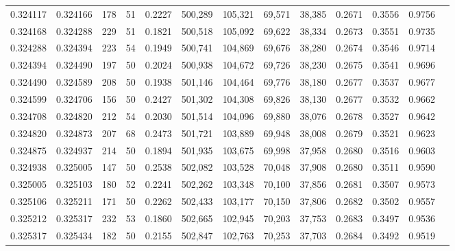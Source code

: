 \begin{tabular}{rrrrrrrrrrrrr}
0.324117 & 0.324166 &   178 &  51 &                                     0.2227 & 500,289 & 105,321 &  69,571 &  38,385 & 0.2671 & 0.3556 & 0.9756 \\
0.324168 & 0.324288 &   229 &  51 &                                     0.1821 & 500,518 & 105,092 &  69,622 &  38,334 & 0.2673 & 0.3551 & 0.9735 \\
0.324288 & 0.324394 &   223 &  54 &                                     0.1949 & 500,741 & 104,869 &  69,676 &  38,280 & 0.2674 & 0.3546 & 0.9714 \\
0.324394 & 0.324490 &   197 &  50 &                                     0.2024 & 500,938 & 104,672 &  69,726 &  38,230 & 0.2675 & 0.3541 & 0.9696 \\
0.324490 & 0.324589 &   208 &  50 &                                     0.1938 & 501,146 & 104,464 &  69,776 &  38,180 & 0.2677 & 0.3537 & 0.9677 \\
0.324599 & 0.324706 &   156 &  50 &                                     0.2427 & 501,302 & 104,308 &  69,826 &  38,130 & 0.2677 & 0.3532 & 0.9662 \\
0.324708 & 0.324820 &   212 &  54 &                                     0.2030 & 501,514 & 104,096 &  69,880 &  38,076 & 0.2678 & 0.3527 & 0.9642 \\
0.324820 & 0.324873 &   207 &  68 &                                     0.2473 & 501,721 & 103,889 &  69,948 &  38,008 & 0.2679 & 0.3521 & 0.9623 \\
0.324875 & 0.324937 &   214 &  50 &                                     0.1894 & 501,935 & 103,675 &  69,998 &  37,958 & 0.2680 & 0.3516 & 0.9603 \\
0.324938 & 0.325005 &   147 &  50 &                                     0.2538 & 502,082 & 103,528 &  70,048 &  37,908 & 0.2680 & 0.3511 & 0.9590 \\
0.325005 & 0.325103 &   180 &  52 &                                     0.2241 & 502,262 & 103,348 &  70,100 &  37,856 & 0.2681 & 0.3507 & 0.9573 \\
0.325106 & 0.325211 &   171 &  50 &                                     0.2262 & 502,433 & 103,177 &  70,150 &  37,806 & 0.2682 & 0.3502 & 0.9557 \\
0.325212 & 0.325317 &   232 &  53 &                                     0.1860 & 502,665 & 102,945 &  70,203 &  37,753 & 0.2683 & 0.3497 & 0.9536 \\
0.325317 & 0.325434 &   182 &  50 &                                     0.2155 & 502,847 & 102,763 &  70,253 &  37,703 & 0.2684 & 0.3492 & 0.9519 \\

\end{tabular}
